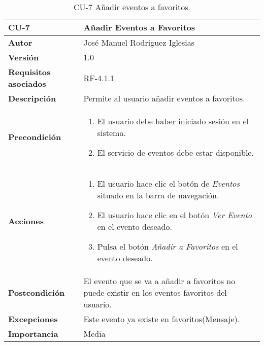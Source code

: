 \begin{table}[h]
	\centering
	\begin{tabularx}{\linewidth}{ p{} p{} }
		\toprule
		\textbf{CU-7}    & \textbf{Añadir Eventos a Favoritos}\\
		\toprule
            \textbf{Autor}                & José Manuel Rodríguez Iglesias \\
		\textbf{Versión}              & 1.0    \\
		\textbf{Requisitos asociados} & RF-4.1.1\\
		\textbf{Descripción}          & Permite al usuario añadir eventos a favoritos. \\
		\textbf{Precondición}         &  
            \begin{enumerate}
			\def\labelenumi{\arabic{enumi}.}
			\tightlist
			\item El usuario debe haber iniciado sesión en el sistema.
			\item El servicio de eventos debe estar disponible.
		\end{enumerate}\\
    
  
		\textbf{Acciones}             &
		\begin{enumerate}
			\def\labelenumi{\arabic{enumi}.}
			\tightlist
			\item El usuario hace clic el botón de\textit{ Eventos} situado en la barra de navegación.
                 \item El usuario hace clic en el botón \textit{Ver Evento} en el evento deseado.
                 \item Pulsa el botón \textit{Añadir a Favoritos} en el evento deseado.
		\end{enumerate}\\
		\textbf{Postcondición}        & El evento que se va a añadir a favoritos no puede existir en los eventos favoritos del usuario. \\
		\textbf{Excepciones}          & Este evento ya existe en favoritos(Mensaje).\\
		\textbf{Importancia}          & Media\\
		\bottomrule
	\end{tabularx}
	\caption{CU-7 Añadir eventos a favoritos.}
\end{table}


